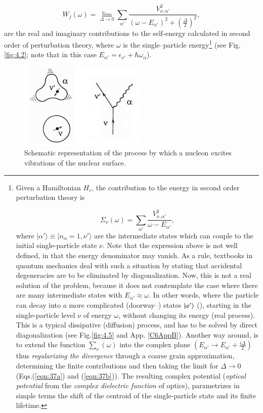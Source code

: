 \begin{equation}
W_j(\omega)  = \lim_{\Delta \rightarrow 0} \sum_{\alpha'} \frac{V_{\nu ,\alpha'}^2}{(\omega -E_{\alpha'})^2 + (\frac{\Delta}{2})^2},
\label{eqn:37b}
\end{equation}
are the real and imaginary contributions to the self-energy calculated in second order of perturbation theory, where $\omega$ is the single--particle energy\footnote{Given a Hamiltonian $H_{c}$, the contribution to the energy in second order perturbation theory is

{\protect
\begin{equation}
\nonumber\Sigma_{\nu}(\omega) = \sum_{\alpha'} \frac{V_{\nu ,\alpha'}^2}{\omega - E_{\alpha'}} ,
\label{eqn:37c}
\end{equation}
}
where $|\alpha' \rangle \equiv |n_{\alpha}=1,\nu' \rangle$ are the intermediate states which can couple to the initial single-particle state $\nu$. Note that the expression above is not well defined, in that the energy denominator may vanish. As a rule, textbooks in quantum mechanics deal with such a situation by stating that accidental degeneracies are to be eliminated by diagonalization. Now, this is not a real solution of the problem, because it does not contemplate the case where there are many intermediate states with $E_{\alpha'} \approx \omega$. In other words, where the particle can decay into a more complicated (doorway--) states $|{\alpha'} \rangle$  (\cite{Feshbach:58}), starting in the single-particle level $\nu$ of energy $\omega$, without changing its energy (real process). This is a typical dissipative (diffusion) process, and has to be solved by direct diagonalization (see Fig.\ref{fig:4.5} and App. \ref{C6AppB}). Another way around, is to extend the function $\sum_{\nu}(\omega)$ into the complex plane $(E_{\alpha'} \rightarrow E_{\alpha'} + \frac{i\Delta}{2})$ thus {\it regularizing the divergence} through a coarse grain approximation, determining the finite contributions and then taking the limit for $\Delta \rightarrow 0$ (Eqs.(\ref{eqn:37a}) and (\ref{eqn:37b})). The resulting complex potential ({\it optical potential} from the {\it complex dielectric function} of optics), parametrizes in simple terms the shift of the centroid of the single-particle state and its finite lifetime.} (see Fig. \ref{fig:4.2}; note that in this case $E_{\alpha'}=\epsilon_{\nu'}+\hbar\omega_\alpha$).

\begin{figure}[h!]
\centerline {
\includegraphics*[width=6cm]{introduccion/figs/figintroD1}
}
\caption{Schematic representation of the process by which a nucleon excites  vibrations of the nuclear surface.}
\label{fig:4.1}
\end{figure}

